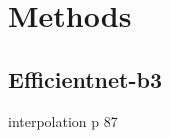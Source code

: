 \documentclass[../main.tex]{subfiles}
\begin{document}
\section{Methods}

\subsection{Efficientnet-b3}


interpolation p 87 \cite{digital_image_processing_gonzales}
\end{document}
